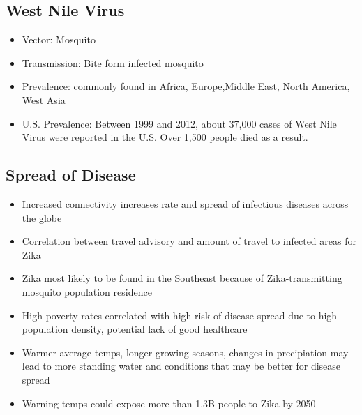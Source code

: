 \documentclass[11pt]{article}
\begin{document}
\subsection{West Nile Virus}
\label{sec:org93cbbab}
\begin{itemize}
\item Vector: Mosquito
\item Transmission: Bite form infected mosquito
\item Prevalence: commonly found in Africa, Europe,Middle East, North America, West Asia
\item U.S. Prevalence: Between 1999 and 2012, about 37,000 cases of West Nile Virus were reported in the U.S. Over 1,500 people died as a result.
\end{itemize}
\subsection{Spread of Disease}
\label{sec:org020b531}
\begin{itemize}
\item Increased connectivity increases rate and spread of infectious diseases across the globe
\item Correlation between travel advisory and amount of travel to infected areas for Zika
\item Zika most likely to be found in the Southeast because of Zika-transmitting mosquito population residence
\item High poverty rates correlated with high risk of disease spread due to high population density, potential lack of good healthcare
\item Warmer average temps, longer growing seasons, changes in precipiation may lead to more standing water and conditions that may be better for disease spread
\item Warning temps could expose more than 1.3B people to Zika by 2050
\end{itemize}
\end{document}
